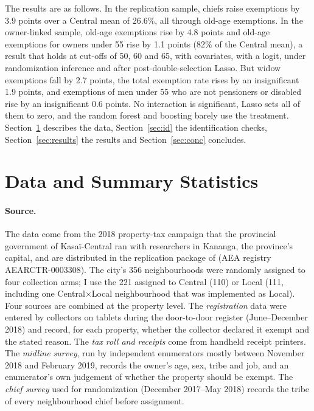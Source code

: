 \documentclass[11pt]{article}
\begin{document}
The results are as follows. In the replication sample, chiefs raise exemptions by 3.9 points over a Central mean of 26.6\%, all through old-age exemptions. In the owner-linked sample, old-age exemptions rise by 4.8 points and old-age exemptions for owners under 55 rise by 1.1 points (82\% of the Central mean), a result that holds at cut-offs of 50, 60 and 65, with covariates, with a logit, under randomization inference and after post-double-selection Lasso. But widow exemptions fall by 2.7 points, the total exemption rate rises by an insignificant 1.9 points, and exemptions of men under 55 who are not pensioners or disabled rise by an insignificant 0.6 points. No interaction is significant, Lasso sets all of them to zero, and the random forest and boosting barely use the treatment. Section~\ref{sec:data} describes the data, Section~\ref{sec:id} the identification checks, Section~\ref{sec:results} the results and Section~\ref{sec:conc} concludes.

\section{Data and Summary Statistics}\label{sec:data}

\paragraph{Source.} The data come from the 2018 property-tax campaign that the provincial government of Kasa\"i-Central ran with researchers in Kananga, the province's capital, and are distributed in the replication package of \citet{balan2022} (AEA registry AEARCTR-0003308). The city's 356 neighbourhoods were randomly assigned to four collection arms; I use the 221 assigned to Central (110) or Local (111, including one Central$\times$Local neighbourhood that was implemented as Local). Four sources are combined at the property level. The \emph{registration} data were entered by collectors on tablets during the door-to-door register (June--December 2018) and record, for each property, whether the collector declared it exempt and the stated reason. The \emph{tax roll and receipts} come from handheld receipt printers. The \emph{midline survey}, run by independent enumerators mostly between November 2018 and February 2019, records the owner's age, sex, tribe and job, and an enumerator's own judgement of whether the property should be exempt. The \emph{chief survey} used for randomization (December 2017--May 2018) records the tribe of every neighbourhood chief before assignment.
\end{document}
